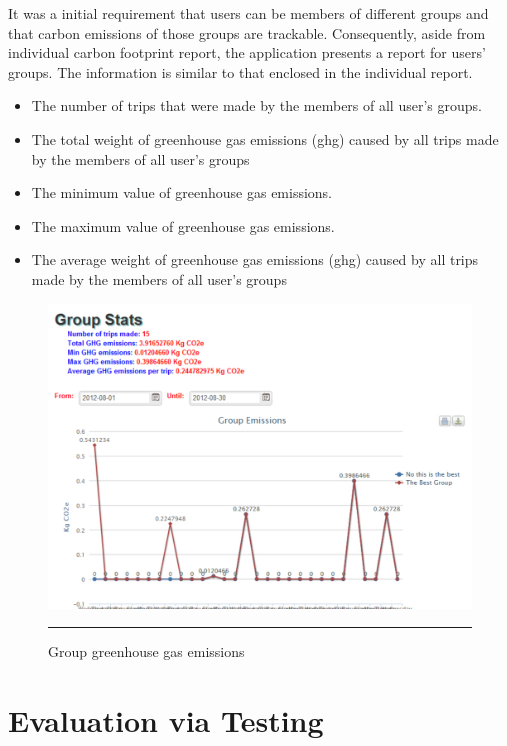 It was a initial requirement that users can be members of different groups and that carbon emissions of those groups are trackable. Consequently, aside from individual carbon footprint report, the application presents a report for users' groups. The information is similar to that enclosed in the individual report.

\begin{itemize}
  \item The number of trips that were made by the members of all user's groups.
  \item The total weight of greenhouse gas emissions (ghg) caused by all trips made by the members of all user's groups
  \item The minimum value of greenhouse gas emissions.
  \item The maximum value of greenhouse gas emissions.
  \item The average weight of greenhouse gas emissions (ghg) caused by all trips made by the members of all user's groups
\end{itemize}

\begin{figure}[htbp]
	\centering
		\includegraphics[scale=0.60]{./Figures/chapter4/figure22.pdf}
		\rule{35em}{0.5pt}
	\caption[Group greenhouse gas emissions]{Group greenhouse gas emissions}
	\label{fig:groupGhgEmissions}
\end{figure}


\section{Evaluation via Testing}

